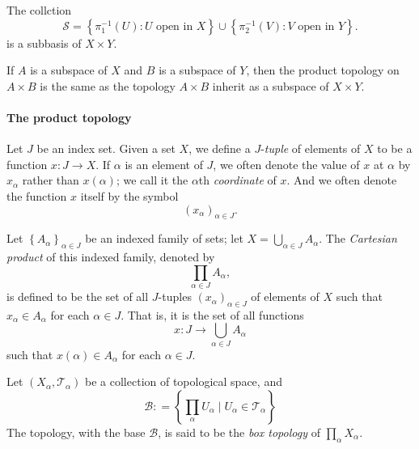 \begin{theorem}
  The collction
  \[
    \mathcal{S} = \left\lbrace \pi_1^{-1}(U): U \text{ open in } X \right\rbrace \cup \left\lbrace \pi_2^{-1}(V): V \text{ open in } Y \right\rbrace.
  \]
  is a subbasis of \( X \times Y \).
\end{theorem}

\begin{theorem}
  If \( A \) is a subspace of \( X \) and \( B \) is a subspace of \( Y \), then the product topology on \( A \times B \) is the same as the topology \( A \times B \) inherit as a subspace of \( X \times Y \).
\end{theorem}

\paragraph{The product topology}

\begin{definition}
  Let \( J \) be an index set.
  Given a set \( X \), we define  a \( J \)-\emph{tuple} of elements of \( X \) to be a function \( x: J \to X \).
  If \( \alpha \) is an element of \( J \), we often denote the value of \( x \) at \( \alpha \) by \( x_\alpha \) rather than \( x(\alpha) \);
  we call it the \( \alpha \)th \emph{coordinate} of \( x \).
  And we often denote the function \( x \) itself by the symbol
  \[
    (x_\alpha)_{\alpha \in J}.
  \]
\end{definition}

\begin{definition}
  Let \( \left\lbrace A_\alpha \right\rbrace_{\alpha \in J} \) be an indexed family of sets;
  let \( X = \bigcup_{\alpha \in J} A_{\alpha} \).
  The \emph{Cartesian product} of this indexed family, denoted by
  \[
    \prod_{\alpha \in J} A_{\alpha},
  \]
  is defined to be the set of all \( J \)-tuples \( (x_\alpha)_{\alpha \in J} \) of elements of \( X \) such that \( x_\alpha \in A_\alpha \) for each \( \alpha \in J \).
  That is, it is the set of all functions
  \[
    x: J \to \bigcup_{\alpha \in J}A_{\alpha}
  \]
  such that \( x(\alpha) \in A_\alpha \) for each \( \alpha \in J \).
\end{definition}

\begin{definition}
  Let \( (X_\alpha, \mathcal{T}_\alpha) \) be a collection of topological space, and
  \[
    \mathcal{B} : =\left\lbrace \prod_\alpha U_\alpha \mid U_\alpha \in \mathcal{T}_\alpha \right\rbrace
  \]
  The topology, with the base \( \mathcal{B} \), is said to be the \emph{box topology} of \( \prod_\alpha X_\alpha \).
\end{definition}

